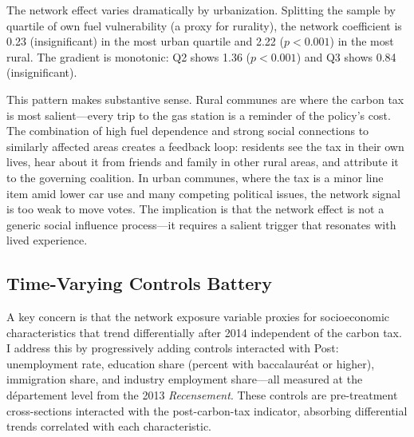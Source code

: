 \documentclass[12pt]{article}
\newcommand{\dept}{d\'{e}partement}
\begin{document}
The network effect varies dramatically by urbanization. Splitting the sample by quartile of own fuel vulnerability (a proxy for rurality), the network coefficient is 0.23 (insignificant) in the most urban quartile and 2.22 ($p < 0.001$) in the most rural. The gradient is monotonic: Q2 shows 1.36 ($p < 0.001$) and Q3 shows 0.84 (insignificant).

This pattern makes substantive sense. Rural communes are where the carbon tax is most salient---every trip to the gas station is a reminder of the policy's cost. The combination of high fuel dependence and strong social connections to similarly affected areas creates a feedback loop: residents see the tax in their own lives, hear about it from friends and family in other rural areas, and attribute it to the governing coalition. In urban communes, where the tax is a minor line item amid lower car use and many competing political issues, the network signal is too weak to move votes. The implication is that the network effect is not a generic social influence process---it requires a salient trigger that resonates with lived experience.

\subsection{Time-Varying Controls Battery}

A key concern is that the network exposure variable proxies for socioeconomic characteristics that trend differentially after 2014 independent of the carbon tax. I address this by progressively adding controls interacted with Post: unemployment rate, education share (percent with baccalaur\'{e}at or higher), immigration share, and industry employment share---all measured at the \dept{} level from the 2013 \textit{Recensement}. These controls are pre-treatment cross-sections interacted with the post-carbon-tax indicator, absorbing differential trends correlated with each characteristic.
\end{document}
